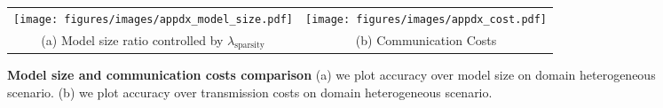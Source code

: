 \begin{figure*}[h!]
\begin{tabular}{cc}
     \texttt{[image: figures/images/appdx\_model\_size.pdf]} & 
     \hspace{-0.1in} \texttt{[image: figures/images/appdx\_cost.pdf]}\\
     (a) Model size ratio controlled by $\lambda_{\text{sparsity}}$ &
     (b) Communication Costs 
\end{tabular}
\caption{\textbf{Model size and communication costs comparison} (a) we plot accuracy over model size on domain heterogeneous scenario. (b) we plot accuracy over transmission costs on domain heterogeneous scenario.}
\label{fig:model_size}
\end{figure*}